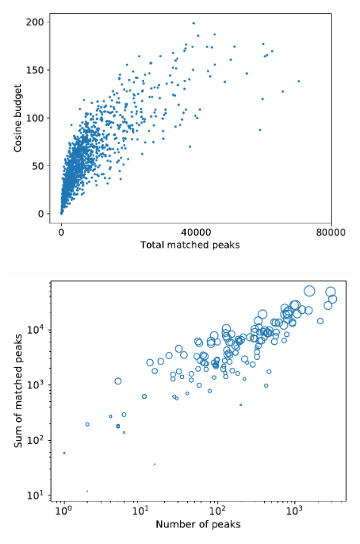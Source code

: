 \begin{figure}[htbp]

    \begin{subfigure}[b]{0.49\textwidth}
        \centering
        \includegraphics[width=\textwidth]{include/img/results/sum_cosine_vs_matched_peaks.pdf}
        \caption{}
        \label{fig:cross_cosine}
        \vspace{0.1cm}
        \begin{minipage}[t]{\textwidth}
        \end{minipage}
    \end{subfigure}
    \hfill
    \begin{subfigure}[b]{0.49\textwidth}
        \centering
        \includegraphics[width=\textwidth]{include/img/results/matched_peaks.pdf}

\end{subfigure}
\end{figure}
